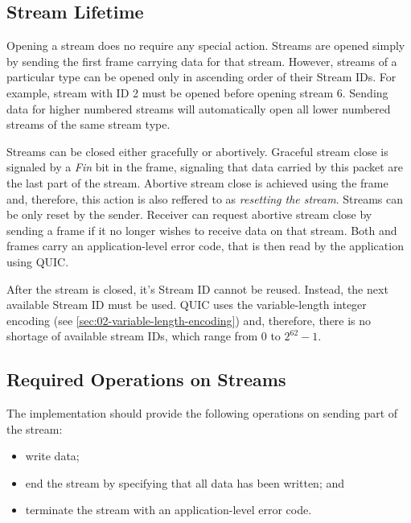 \subsection{Stream Lifetime}

Opening a stream does no require any special action. Streams are opened simply by sending the first
\STREAM{} frame carrying data for that stream. However, streams of a particular type can be opened
only in ascending order of their Stream IDs. For example, stream with ID 2 must be opened before
opening stream 6. Sending data for higher numbered streams will automatically open all lower
numbered streams of the same stream type.

Streams can be closed either gracefully or abortively. Graceful stream close is signaled by a
\textit{Fin} bit in the \STREAM{} frame, signaling that data carried by this packet are the last
part of the stream. Abortive stream close is achieved using the \RESETSTREAM{} frame and, therefore,
this action is also reffered to as \textit{resetting the stream}. Streams can be only reset by the
sender. Receiver can request abortive stream close by sending a \STOPSENDING{} frame if it no longer
wishes to receive data on that stream. Both \RESETSTREAM{} and \STOPSENDING{} frames carry an
application-level error code, that is then read by the application using QUIC.

After the stream is closed, it's Stream ID cannot be reused. Instead, the next available Stream ID
must be used. QUIC uses the variable-length integer encoding (see
\autoref{sec:02-variable-length-encoding}) and, therefore, there is no shortage of available stream
IDs, which range from 0 to $2^{62}-1$.

\subsection{Required Operations on Streams}

The implementation should provide the following operations on sending part of the stream:

\begin{itemize}

  \item write data;

  \item end the stream by specifying that all data has been written; and

  \item terminate the stream with an application-level error code.

\end{itemize}

